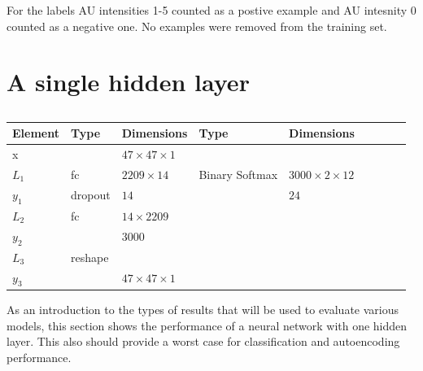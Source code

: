     For the labels AU intensities 1-5 counted as a postive example and AU intesnity 0 counted as a negative one.
    No examples were removed from the training set.

  \section{A single hidden layer}
    \begin{table}[h!]
    \centering
    {\footnotesize
    \begin{tabular}{|lllllllll|}
    \hline
    \multicolumn{1}{|l|}{Element} & Type     & \multicolumn{1}{l|}{Dimensions}                     & Type     & \multicolumn{1}{l|}{Dimensions}                      \\ \hline
    \multicolumn{1}{|l|}{x}       &          & \multicolumn{1}{l|}{$47\times47\times1$}            &          & \multicolumn{1}{l|}{}                                \\ \hline
    \multicolumn{1}{|l|}{$L_1$}   & fc       & \multicolumn{1}{l|}{$2209\times14$}              & Binary Softmax & \multicolumn{1}{l|}{$3000\times2\times12$}        \\
    \multicolumn{1}{|l|}{$y_1$}   & dropout  & \multicolumn{1}{l|}{$14$}                         &          & \multicolumn{1}{l|}{$24$}                              \\ \hline
    \multicolumn{1}{|l|}{$L_2$}   & fc       & \multicolumn{1}{l|}{$14\times2209$}              &          & \multicolumn{1}{l|}{}                                   \\
    \multicolumn{1}{|l|}{$y_2$}   &          & \multicolumn{1}{l|}{$3000$}                         &          & \multicolumn{1}{l|}{}                                \\ \hline
    \multicolumn{1}{|l|}{$L_3$}   & reshape & \multicolumn{1}{l|}{}                    &          & \multicolumn{1}{l|}{}                                \\
    \multicolumn{1}{|l|}{$y_3$}   &          & \multicolumn{1}{l|}{$47\times47\times 1$}          &          & \multicolumn{1}{l|}{}                                \\ \hline
    \end{tabular}

    \caption{} \label{net:simple1}

    }
    \end{table}
    As an introduction to the types of results that will be used to evaluate various
    models, this section shows the performance of a neural network with one
    hidden layer. This also should provide a worst case for classification and autoencoding performance.

